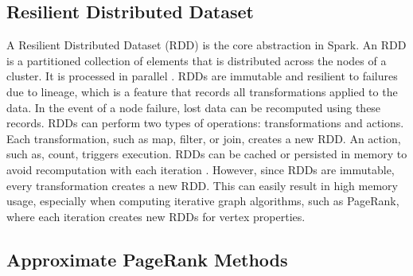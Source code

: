 \subsection{Resilient Distributed Dataset}
A Resilient Distributed Dataset (RDD) is the core abstraction in Spark. An RDD is a partitioned collection of elements that is distributed across the nodes of a cluster. It is processed in parallel \cite{apache_spark_rdd_2025}. RDDs are immutable and resilient to failures due to lineage, which is a feature that records all transformations applied to the data. In the event of a node failure, lost data can be recomputed using these records. RDDs can perform two types of operations: transformations and actions. Each transformation, such as map, filter, or join, creates a new RDD. An action, such as, count, triggers execution. RDDs can be cached or persisted in memory to avoid recomputation with each iteration \cite{chambers_spark_2018}. However, since RDDs are immutable, every transformation creates a new RDD. This can easily result in high memory usage, especially when computing iterative graph algorithms, such as PageRank, where each iteration creates new RDDs for vertex properties. 



\subsection{Approximate PageRank Methods}

